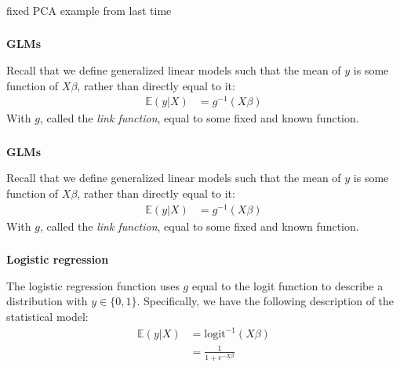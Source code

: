 \begin{frame}[fragile] \frametitle{}

{\color{yaleblue}\fontsize{16pt}{20pt}\selectfont fixed PCA example from last time}

\end{frame}

\begin{frame}[fragile] \frametitle{}

\textbf{GLMs}

Recall that we define generalized linear models such that
the mean of $y$ is some function of $X\beta$, rather than
directly equal to it:
\begin{align*}
\mathbb{E} (y | X) &= g^{-1} \left( X \beta \right)
\end{align*}
With $g$, called the \textit{link function}, equal to some
fixed and known function.

\end{frame}

\begin{frame}[fragile] \frametitle{}

\textbf{GLMs}

Recall that we define generalized linear models such that
the mean of $y$ is some function of $X\beta$, rather than
directly equal to it:
\begin{align*}
\mathbb{E} (y | X) &= g^{-1} \left( X \beta \right)
\end{align*}
With $g$, called the \textit{link function}, equal to some
fixed and known function.

\end{frame}

\begin{frame}[fragile] \frametitle{}

\textbf{Logistic regression}

The logistic regression function uses $g$ equal to the logit
function to describe a distribution with $y \in \{0,1\}$.
Specifically, we have the following description of the statistical
model:
\begin{align*}
\mathbb{E} (y | X) &= \text{logit}^{-1} \left( X \beta \right) \\
&= \frac{1}{1 + e^{- X \beta}}
\end{align*}

\end{frame}

